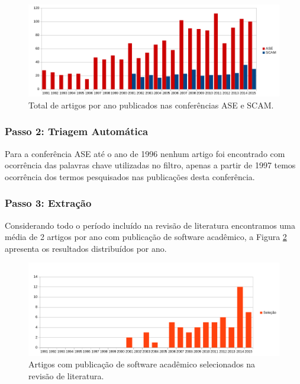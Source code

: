 \begin{figure}[h]
  \center
  \includegraphics[scale=0.65]{imagens/artigos-por-ano.png}
  \caption{Total de artigos por ano publicados nas conferências ASE e SCAM.}
  \label{artigos-por-ano}
\end{figure}


\subsubsection{Passo 2: Triagem Automática}

Para a conferência ASE até o ano de 1996 nenhum artigo foi encontrado com
ocorrência das palavras chave utilizadas no filtro, apenas a partir de 1997
temos ocorrência dos termos pesquisados nas publicações desta conferência.

\subsubsection{Passo 3: Extração}

Considerando todo o período incluído na revisão de literatura encontramos uma
média de 2 artigos por ano com publicação de software acadêmico, a Figura
\ref{artigos-com-software-por-ano} apresenta os resultados distribuídos por
ano.

\begin{figure}[h]
  \center
  \includegraphics[scale=0.65]{imagens/artigos-com-software-por-ano.png}
  \caption{Artigos com publicação de software acadêmico selecionados na revisão de literatura.}
  \label{artigos-com-software-por-ano}
\end{figure}

